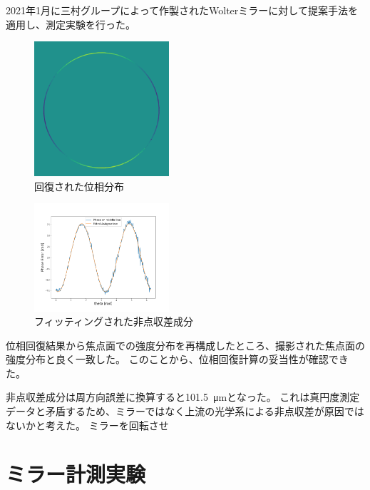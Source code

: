 \documentclass[a4j]{jarticle}
\begin{document}
2021年1月に三村グループによって作製されたWolterミラーに対して提案手法を適用し、測定実験を行った。

\begin{figure}[!ht]
\centering
\includegraphics[width=5cm]{../thesis/chap5/figure/reconstructed_phase_unwrapped.png}
\caption{回復された位相分布}
\label{fig:reconstructed_phase_unwrapped}
\end{figure}

\begin{figure}[!ht]
\centering
\includegraphics[width=5cm]{../thesis/chap5/figure/astigmatism_fitted.png}
\caption{フィッティングされた非点収差成分}
\label{fig:astigmatism_fitted}
\end{figure}

位相回復結果から焦点面での強度分布を再構成したところ、撮影された焦点面の強度分布と良く一致した。
このことから、位相回復計算の妥当性が確認できた。

非点収差成分は周方向誤差に換算すると\SI{101.5}{\micro \metre}となった。
これは真円度測定データと矛盾するため、ミラーではなく上流の光学系による非点収差が原因ではないかと考えた。
ミラーを回転させ

\section{ミラー計測実験}



\end{document}
